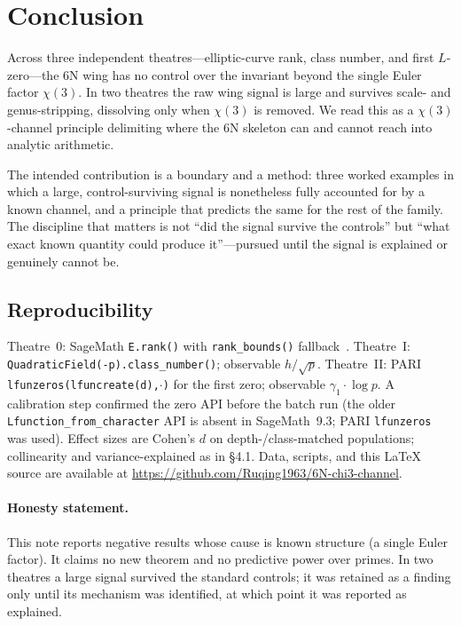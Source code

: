 \documentclass[11pt]{article}
\begin{document}
\section{Conclusion}
Across three independent theatres---elliptic-curve rank, class number, and first $L$-zero---the 6N wing
has no control over the invariant beyond the single Euler factor $\chi(3)$. In two theatres the raw
wing signal is large and survives scale- and genus-stripping, dissolving only when $\chi(3)$ is
removed. We read this as a $\chi(3)$-channel principle delimiting where the 6N skeleton can and cannot
reach into analytic arithmetic.

The intended contribution is a boundary and a method: three worked examples in which a large,
control-surviving signal is nonetheless fully accounted for by a known channel, and a principle that
predicts the same for the rest of the family. The discipline that matters is not ``did the signal
survive the controls'' but ``what exact known quantity could produce it''---pursued until the signal
is explained or genuinely cannot be.

\subsection*{Reproducibility}
Theatre~0: SageMath \texttt{E.rank()} with \texttt{rank\_bounds()} fallback~\cite{chen-crt}.
Theatre~I: \texttt{QuadraticField(-p).class\_number()}; observable $h/\sqrt{p}$.
Theatre~II: PARI \texttt{lfunzeros(lfuncreate(d),$\cdot$)} for the first zero; observable
$\gamma_1\cdot\log p$. A calibration step confirmed the zero API before the batch run (the older
\texttt{Lfunction\_from\_character} API is absent in SageMath~9.3; PARI \texttt{lfunzeros} was used).
Effect sizes are Cohen's $d$ on depth-/class-matched populations; collinearity and variance-explained
as in \S4.1. Data, scripts, and this \LaTeX{} source are available at
\url{https://github.com/Ruqing1963/6N-chi3-channel}.

\paragraph{Honesty statement.} This note reports negative results whose cause is known structure (a
single Euler factor). It claims no new theorem and no predictive power over primes. In two theatres a
large signal survived the standard controls; it was retained as a finding only until its mechanism was
identified, at which point it was reported as explained.
\end{document}

